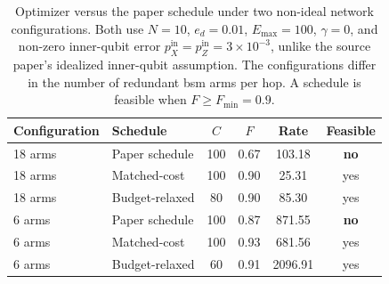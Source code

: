 \begin{table}[ht]
    \centering
    \small
    \begin{tabular}{llcccc}
        \hline
        Configuration & Schedule & $C$ & $F$ & Rate & Feasible \\
        \hline
        18 arms & Paper schedule & 100 & 0.67 & 103.18 & \textbf{no} \\
        18 arms & Matched-cost & 100 & 0.90 & 25.31 & yes \\
        18 arms & Budget-relaxed & 80 & 0.90 & 85.30 & yes \\
        \hline
        6 arms & Paper schedule & 100 & 0.87 & 871.55 & \textbf{no} \\
        6 arms & Matched-cost & 100 & 0.93 & 681.56 & yes \\
        6 arms & Budget-relaxed & 60 & 0.91 & 2096.91 & yes \\
        \hline
    \end{tabular}

    \caption[Optimizer vs.\ paper schedule under non-ideal networks]{Optimizer versus the paper schedule under two non-ideal network configurations. Both use $N=10$, $e_d=0.01$, $E_{\max}=100$, $\gamma=0$, and non-zero inner-qubit error $p_X^{\mathrm{in}}=p_Z^{\mathrm{in}}=3\times10^{-3}$, unlike the source paper's idealized inner-qubit assumption. The configurations differ in the number of redundant \Gls{bsm} arms per hop. A schedule is feasible when $F\ge F_{\min}=0.9$.}
    \label{tab:netgen}
\end{table}